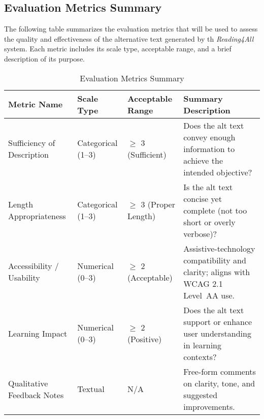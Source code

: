 \documentclass[12pt, titlepage]{article}
\begin{document}
\subsection{Evaluation Metrics Summary}
\label{appendix:evaluation-metrics}
The following table summarizes the evaluation metrics that will be
used to assess the quality and effectiveness of the alternative text
generated by th \textit{Reading4All} system. Each metric includes its scale
type, acceptable range, and a brief description of its purpose.
\begin{table}[H]
  \centering
  \caption{Evaluation Metrics Summary}
  \label{tab:evaluation-metrics-summary}
  \begin{tabular}{ |p{3.5cm}|p{3cm}|p{3cm}|p{4cm}| }
    \hline
    \textbf{Metric Name} & \textbf{Scale Type} & \textbf{Acceptable
    Range} & \textbf{Summary Description} \\
    \hline
    Sufficiency of Description
    & Categorical (1--3)
    & $\geq$ 3 (Sufficient)
    & Does the alt text convey enough information to achieve the
    intended objective? \\
    \hline
    Length Appropriateness
    & Categorical (1--3)
    & $\geq$ 3 (Proper Length)
    & Is the alt text concise yet complete (not too short or overly verbose)? \\
    \hline
    Accessibility / Usability
    & Numerical (0--3)
    & $\geq$ 2 (Acceptable)
    & Assistive-technology compatibility and clarity; aligns with
    WCAG 2.1 Level~AA use. \\
    \hline
    Learning Impact
    & Numerical (0--3)
    & $\geq$ 2 (Positive)
    & Does the alt text support or enhance user understanding in
    learning contexts? \\
    \hline
    Qualitative Feedback Notes
    & Textual
    & N/A
    & Free-form comments on clarity, tone, and suggested improvements. \\
    \hline
  \end{tabular}
\end{table}
\end{document}
